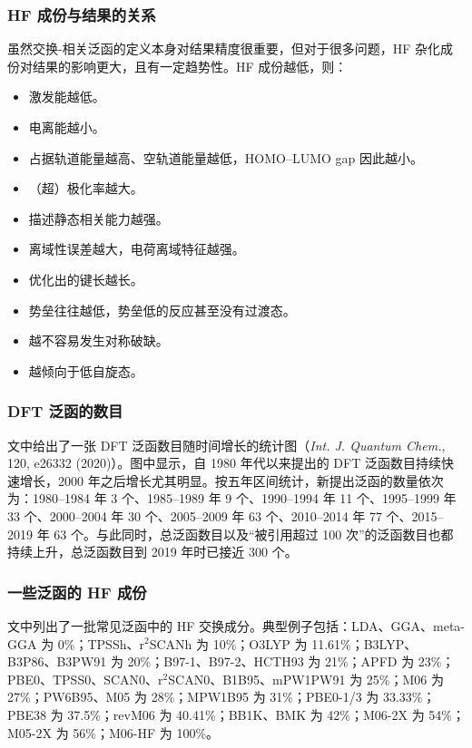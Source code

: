 \subsubsection*{HF 成份与结果的关系}

虽然交换-相关泛函的定义本身对结果精度很重要，但对于很多问题，HF 杂化成份对结果的影响更大，且有一定趋势性。HF 成份越低，则：
\begin{itemize}
  \item 激发能越低。
  \item 电离能越小。
  \item 占据轨道能量越高、空轨道能量越低，HOMO--LUMO gap 因此越小。
  \item （超）极化率越大。
  \item 描述静态相关能力越强。
  \item 离域性误差越大，电荷离域特征越强。
  \item 优化出的键长越长。
  \item 势垒往往越低，势垒低的反应甚至没有过渡态。
  \item 越不容易发生对称破缺。
  \item 越倾向于低自旋态。
\end{itemize}

\subsubsection*{DFT 泛函的数目}

文中给出了一张 DFT 泛函数目随时间增长的统计图（\textit{Int. J. Quantum Chem.}, 120, e26332 (2020)）。图中显示，自 1980 年代以来提出的 DFT 泛函数目持续快速增长，2000 年之后增长尤其明显。按五年区间统计，新提出泛函的数量依次为：1980--1984 年 3 个、1985--1989 年 9 个、1990--1994 年 11 个、1995--1999 年 33 个、2000--2004 年 30 个、2005--2009 年 63 个、2010--2014 年 77 个、2015--2019 年 63 个。与此同时，总泛函数目以及“被引用超过 100 次”的泛函数目也都持续上升，总泛函数目到 2019 年时已接近 300 个。

\subsubsection*{一些泛函的 HF 成份}

文中列出了一批常见泛函中的 HF 交换成分。典型例子包括：LDA、GGA、meta-GGA 为 0\%；TPSSh、r$^2$SCANh 为 10\%；O3LYP 为 11.61\%；B3LYP、B3P86、B3PW91 为 20\%；B97-1、B97-2、HCTH93 为 21\%；APFD 为 23\%；PBE0、TPSS0、SCAN0、r$^2$SCAN0、B1B95、mPW1PW91 为 25\%；M06 为 27\%；PW6B95、M05 为 28\%；MPW1B95 为 31\%；PBE0-1/3 为 33.33\%；PBE38 为 37.5\%；revM06 为 40.41\%；BB1K、BMK 为 42\%；M06-2X 为 54\%；M05-2X 为 56\%；M06-HF 为 100\%。

